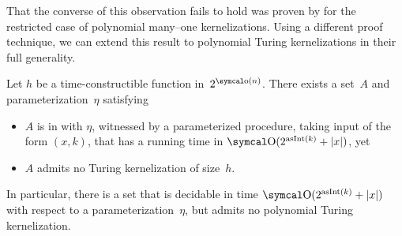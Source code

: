 That the converse of this observation fails to hold was proven by \textcite{bodlaender2009problems} for the restricted case of polynomial many--one kernelizations.
Using a different proof technique, we can extend this result to polynomial Turing kernelizations in their full generality.
\begin{theorem}
\label{thm:htop}%
  Let $h$ be a time-constructible function in~$2^{\littleo(n)}$.
  There exists a set~$A$ and parameterization~$\eta$ satisfying
  \begin{itemize}
  \item
    $A$ is in  with $\eta$, witnessed by a parameterized procedure, taking input of the form $(x, k)$, that has a running time in $\bigO(2^{\asNat(k)} + \length{x})$, yet
  \item
    $A$ admits no Turing kernelization of size~$h$.
  \end{itemize}
  In particular, there is a set that is decidable in time $\bigO(2^{\asNat(k)} + \length{x})$ with respect to a parameterization~$\eta$, but admits no polynomial Turing kernelization.
\end{theorem}
